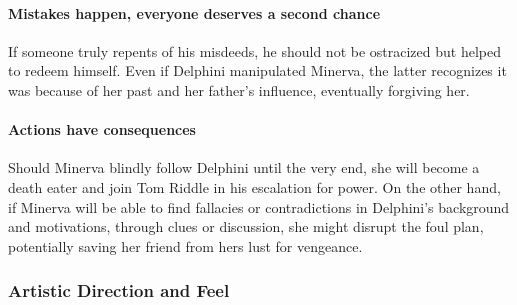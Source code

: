\paragraph{Mistakes happen, everyone deserves a second chance}
If someone truly repents of his misdeeds, he should not be ostracized but helped to redeem himself. Even if Delphini manipulated Minerva, the latter recognizes it was because of her past and her father's influence, eventually forgiving her.

\paragraph{Actions have consequences}
Should Minerva blindly follow Delphini until the very end, she will become a death eater and join Tom Riddle in his escalation for power. On the other hand, if Minerva will be able to find fallacies or contradictions in Delphini's background and motivations, through clues or discussion, she might disrupt the foul plan, potentially saving her friend from hers lust for vengeance.

\subsubsection{Artistic Direction and Feel}

